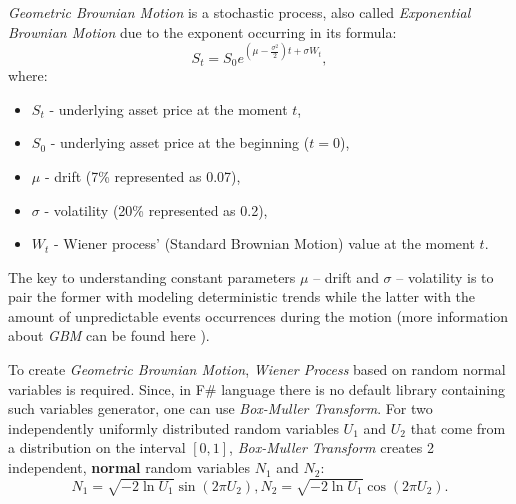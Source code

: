         \textit{Geometric Brownian Motion} is a stochastic process, also called \textit{Exponential Brownian Motion} due to the exponent occurring in its formula:
        \[
        S_t = S_0e^{(\mu - \frac{\sigma^2}{2})t + \sigma W_t}
        ,
        \]
        where:
        \begin{itemize}
        \item $S_t$ - underlying asset price at the moment $t$,
        \item $S_0$ - underlying asset price at the beginning ($t=0$),
        \item $\mu$ - drift (7\% represented as 0.07),
        \item $\sigma$ - volatility (20\% represented as 0.2),
        \item $W_t$ - Wiener process' (Standard Brownian Motion) value at the moment $t$.
    \end{itemize}
    The key to understanding constant parameters $\mu$ -- drift and $\sigma$ -- volatility is to pair the former with modeling deterministic trends while the latter with the amount of unpredictable events occurrences during the motion (more information about \textit{GBM} can be found here \cite{gbm}).
    
    To create \textit{Geometric Brownian Motion}, \textit{Wiener Process} based on random normal variables is required. Since, in F\# language there is no default library containing such variables generator, one can use \textit{Box-Muller Transform}. For two independently uniformly distributed random variables $U_1$ and $U_2$ that come from a distribution on the interval $[0,1]$, \textit{Box-Muller Transform} creates 2 independent, \textbf{normal} random variables $N_1$ and $N_2$:
    \[
    N_1 = \sqrt{-2\ln{U_1}}\sin(2\pi U_2), N_2 = \sqrt{-2\ln{U_1}}\cos(2\pi U_2)
    .
    \]
    
